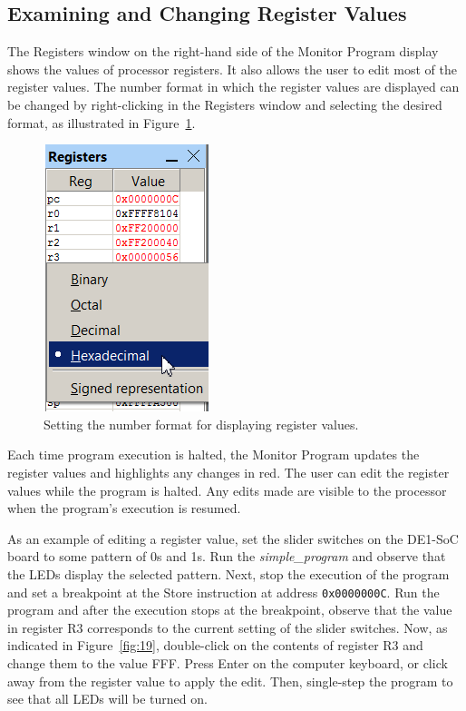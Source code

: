 \documentclass[11pt, twoside, pdftex]{article}
\begin{document}
\subsection{Examining and Changing Register Values}
\label{sec:3.7}

The \textsf{Registers} window on the right-hand side of the
Monitor Program display shows the values of processor registers.
It also allows the user to edit most of the register values. 
The number format in which the register values are displayed
can be changed by right-clicking in the \textsf{Registers}
window and selecting the desired format, as illustrated in 
Figure~\ref{fig:18}.

\begin{figure}[H]
   \begin{center}
      \includegraphics[scale=0.85]{screenshots/figure18.png}
   \end{center}
   \caption{Setting the number format for displaying register values.} 
	 \label{fig:18}
\end{figure}

Each time program execution is halted, the Monitor Program
updates the register values and highlights any changes in red.
The user can edit the register values while the program is
halted. Any edits made are visible to the processor when the
program's execution is resumed.

As an example of editing a register value, set the slider
switches on the DE1-SoC board to some pattern of 0s and 1s.
Run the {\it simple\_program} and observe that the LEDs display
the selected pattern. Next, stop the execution of the program
and set a breakpoint at the Store instruction
at address \texttt{0x0000000C}. Run the program and
after the execution stops at the breakpoint, observe that the
value in register R3 corresponds to the current setting of the
slider switches. 
Now,  as indicated in Figure~\ref{fig:19}, double-click on the contents of
register R3 and change them to the value FFF.  
Press \textsf{Enter} on the computer keyboard, or click away from
the register value to apply the edit. 
Then, single-step the program to see that all LEDs will be
turned on. 
\end{document}
